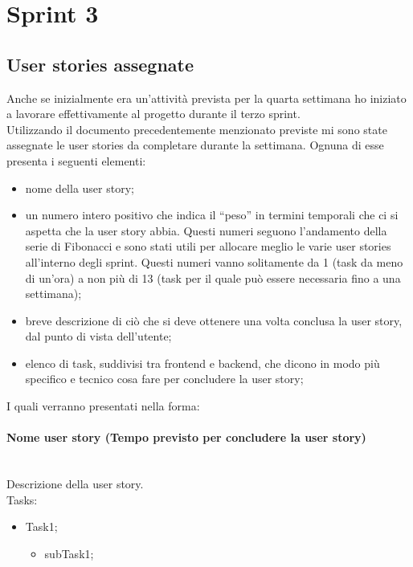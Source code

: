 
\section{Sprint 3}
\label{sec:sprint3}
\subsection{User stories assegnate}
Anche se inizialmente era un'attività prevista per la quarta settimana ho iniziato a lavorare effettivamente al progetto durante il terzo sprint. \\
Utilizzando il documento precedentemente menzionato previste mi sono state assegnate le user stories da completare durante la settimana.
\noindent Ognuna di esse presenta i seguenti elementi:
\begin{itemize}
  \item nome della user story;
  \item un numero intero positivo che indica il ``peso'' in termini temporali che ci si aspetta che la user story abbia. Questi numeri seguono l'andamento della serie di Fibonacci e sono stati utili per allocare meglio le varie user stories all'interno degli sprint. Questi numeri vanno solitamente da 1 (task da meno di un'ora) a non più di 13 (task per il quale può essere necessaria fino a una settimana); 
  \item breve descrizione di ciò che si deve ottenere una volta conclusa la user story, dal punto di vista dell'utente;
  \item elenco di task, suddivisi tra frontend e backend, che dicono in modo più specifico e tecnico cosa fare per concludere la user story;
\end{itemize}
I quali verranno presentati nella forma:

\paragraph{Nome user story (Tempo previsto per concludere la user story)}\mbox{} \\[\baselineskip]
\noindent Descrizione della user story. \\

\noindent Tasks:

\begin{itemize}
  \item Task1;
  \begin{itemize}
    \item subTask1;
  \end{itemize}
\end{itemize}
\vspace*{5pt}
